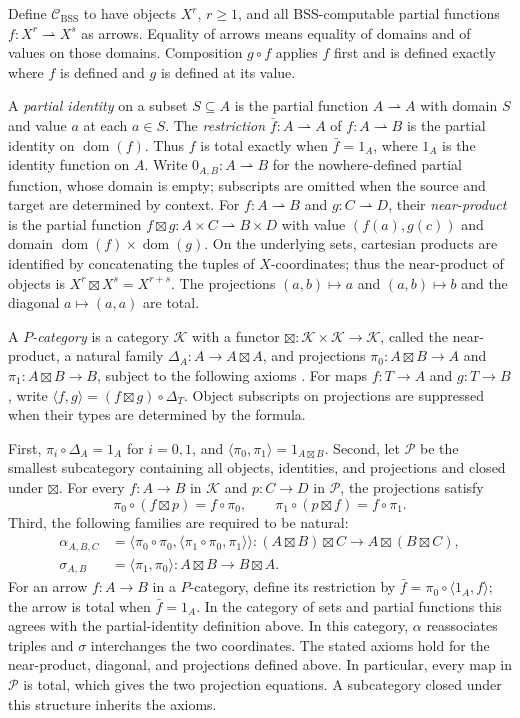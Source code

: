 \documentclass[11pt]{article}
\newcommand{\C}{\mathcal C_{\mathrm{BSS}}}
\newcommand{\pfn}{\rightharpoonup}
\newcommand{\dom}{\operatorname{dom}}
\begin{document}
Define $\C$ to have objects $X^r$, $r\geq1$, and all BSS-computable
partial functions $f:X^r\pfn X^s$ as arrows. Equality of arrows means
equality of domains and of values on those domains. Composition
$g\circ f$ applies $f$ first and is defined exactly where $f$ is
defined and $g$ is defined at its value.

A \emph{partial identity} on a subset $S\subseteq A$ is the partial
function $A\pfn A$ with domain $S$ and value $a$ at each $a\in S$.
The \emph{restriction} $\bar f:A\pfn A$ of $f:A\pfn B$ is the
partial identity on $\dom(f)$. Thus $f$ is total exactly when
$\bar f=1_A$, where $1_A$ is the identity
function on $A$. Write $0_{A,B}:A\pfn B$ for the nowhere-defined
partial function, whose domain is empty; subscripts are omitted
when the source and target are determined by context.
For $f:A\pfn B$ and $g:C\pfn D$, their \emph{near-product} is
the partial function
$f\boxtimes g:A\times C\pfn B\times D$ with value
$(f(a),g(c))$ and domain $\dom(f)\times\dom(g)$.
On the underlying sets, cartesian products are identified by
concatenating the tuples of $X$-coordinates; thus the near-product
of objects is $X^r\boxtimes X^s=X^{r+s}$.
The projections $(a,b)\mapsto a$ and $(a,b)\mapsto b$ and the
diagonal $a\mapsto(a,a)$ are total.

A \emph{$P$-category} is a category $\mathcal K$ with a functor
$\boxtimes:\mathcal K\times\mathcal K\to\mathcal K$, called the
near-product, a natural family $\Delta_A:A\to A\boxtimes A$,
and projections $\pi_0:A\boxtimes B\to A$ and
$\pi_1:A\boxtimes B\to B$, subject to the following axioms
\cite[\S5]{Heller90}. For maps $f:T\to A$ and $g:T\to B$, write
$\langle f,g\rangle=(f\boxtimes g)\circ\Delta_T$.
Object subscripts on projections are suppressed when their types
are determined by the formula.

First, $\pi_i\circ\Delta_A=1_A$ for $i=0,1$, and
$\langle\pi_0,\pi_1\rangle=1_{A\boxtimes B}$.
Second, let $\mathcal P$ be the smallest subcategory containing all
objects, identities, and projections and closed under $\boxtimes$.
For every $f:A\to B$ in $\mathcal K$ and $p:C\to D$ in
$\mathcal P$, the projections satisfy
\[
 \pi_0\circ(f\boxtimes p)=f\circ\pi_0,
 \qquad
 \pi_1\circ(p\boxtimes f)=f\circ\pi_1.
\]
Third, the following families are required to be natural:
\[
\begin{aligned}
 \alpha_{A,B,C}
  &=\langle\pi_0\circ\pi_0,
          \langle\pi_1\circ\pi_0,\pi_1\rangle\rangle
    :(A\boxtimes B)\boxtimes C\longrightarrow A\boxtimes(B\boxtimes C),\\
 \sigma_{A,B}
  &=\langle\pi_1,\pi_0\rangle
    :A\boxtimes B\longrightarrow B\boxtimes A.
\end{aligned}
\]
For an arrow $f:A\to B$ in a $P$-category, define
its restriction by $\bar f=\pi_0\circ\langle1_A,f\rangle$;
the arrow is total when $\bar f=1_A$.
In the category of sets and partial functions this agrees with the
partial-identity definition above. In this category,
$\alpha$ reassociates triples and $\sigma$ interchanges the two
coordinates. The stated axioms hold for the near-product, diagonal,
and projections defined above. In particular, every map in
$\mathcal P$ is total, which gives the two projection equations.
A subcategory closed under this structure inherits the axioms.
\end{document}
